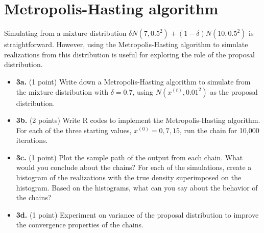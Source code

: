 \documentclass[
]{article}
\providecommand{\tightlist}{%
  \setlength{\itemsep}{0pt}\setlength{\parskip}{0pt}}
\begin{document}
\hypertarget{metropolis-hasting-algorithm}{%
\section{Metropolis-Hasting
algorithm}\label{metropolis-hasting-algorithm}}

Simulating from a mixture distribution
\(\delta N(7, 0.5^2)+(1-\delta)N(10, 0.5^2)\) is straightforward.
However, using the Metropolis-Hasting algorithm to simulate realizations
from this distribution is useful for exploring the role of the proposal
distribution.

\begin{itemize}
\tightlist
\item
  \textbf{3a.} (1 point) Write down a Metropolis-Hasting algorithm to
  simulate from the mixture distribution with \(\delta=0.7\), using
  \(N(x^{(t)},0.01^2)\) as the proposal distribution.
\item
  \textbf{3b.} (2 points) Write R codes to implement the
  Metropolis-Hasting algorithm. For each of the three starting values,
  \(x^{(0)}=0, 7, 15\), run the chain for 10,000 iterations.
\item
  \textbf{3c.} (1 point) Plot the sample path of the output from each
  chain. What would you conclude about the chains? For each of the
  simulations, create a histogram of the realizations with the true
  density superimposed on the histogram. Based on the histograms, what
  can you say about the behavior of the chains?
\item
  \textbf{3d.} (1 point) Experiment on variance of the proposal
  distribution to improve the convergence properties of the chains.
\end{itemize}
\end{document}

